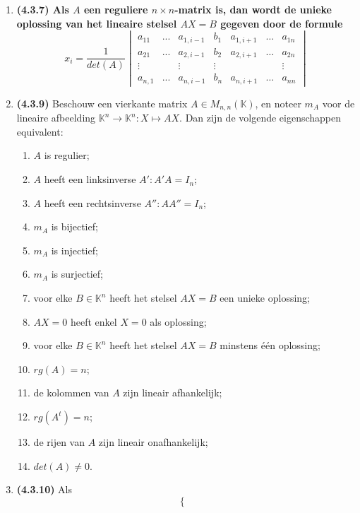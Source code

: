 \documentclass[12pt]{article}
\begin{document}
\begin{enumerate}
        \item \textbf{\textbf{(4.3.7)} Als $A$ een reguliere $n \times n$-matrix is, dan wordt de unieke oplossing van het lineaire stelsel $AX=B$ gegeven door de formule $$x_i= \frac{1}{det(A)} \begin{vmatrix}
            a_{11} & ... & a_{1,i-1} & b_1 &a_{1,i+1} & \dots & a_{1n} \\
            a_{21} & ... & a_{2,i-1} & b_2 &a_{2,i+1} & \dots & a_{2n} \\
            \vdots & & \vdots & \vdots & & & \vdots \\
            a_{n,1} & ... & a_{n,i-1} & b_n & a_{n,i+1} & \dots & a_{nn} 
        \end{vmatrix}$$}
        \item \textbf{(4.3.9)} Beschouw een vierkante matrix $A \in M_{n,n}(\mathbb{K})$, en noteer $m_A$ voor de lineaire afbeelding $\mathbb{K}^n \rightarrow \mathbb{K}^n:X \mapsto AX$. Dan zijn de volgende eigenschappen equivalent: \begin{enumerate}
            \item $A$ is regulier;
            \item $A$ heeft een linksinverse $A':A'A=I_n$;
            \item $A$ heeft een rechtsinverse $A'':AA''=I_n$;
            \item $m_A$ is bijectief;
            \item $m_A$ is injectief;
            \item $m_A$ is surjectief;
            \item voor elke $B \in \mathbb{K}^n$ heeft het stelsel $AX=B$ een unieke oplossing;
            \item $AX=0$ heeft enkel $X=0$ als oplossing;
            \item voor elke $B \in \mathbb{K}^n$ heeft het stelsel $AX=B$ minstens één oplossing;
            \item $rg(A)=n$;
            \item de kolommen van $A$ zijn lineair afhankelijk;
            \item $rg(A^t)=n$;
            \item de rijen van $A$ zijn lineair onafhankelijk;
            \item $det(A) \neq 0$.
        \end{enumerate}
        \item \textbf{(4.3.10)} Als \begin{equation}
            \begin{cases} 

\end{cases}
\end{equation}
\end{enumerate}
\end{document}
